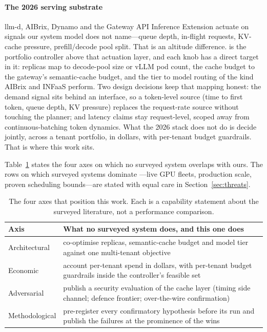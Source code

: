 \paragraph{The 2026 serving substrate}
llm-d, AIBrix, Dynamo and the Gateway API Inference Extension actuate on
signals our system model does not name---queue depth, in-flight requests,
KV-cache pressure, prefill/decode pool split. That is an altitude
difference. \polyforge{} is the portfolio controller above that actuation
layer, and each knob has a direct target in it: replicas map to decode-pool
size or vLLM pod count, the cache budget to the gateway's semantic-cache
budget, and the tier to model routing of the kind AIBrix and INFaaS
perform. Two design decisions keep that mapping honest: the demand signal
sits behind an interface, so a token-level source (time to first token,
queue depth, KV pressure) replaces the request-rate source without touching
the planner; and latency claims stay request-level, scoped away from
continuous-batching token dynamics. What the 2026 stack does not do is
decide jointly, across a tenant portfolio, in dollars, with per-tenant
budget guardrails. That is where this work sits.

Table~\ref{tab:capability} states the four axes on which no surveyed system
overlaps with ours. The rows on which surveyed systems dominate
\polyforge{}---live GPU fleets, production scale, proven scheduling
bounds---are stated with equal care in Section~\ref{sec:threats}.

\begin{table}[htbp]
\centering\tablefont
\begin{tabularx}{\textwidth}{@{}lX@{}}
\toprule
\textbf{Axis} & \textbf{What no surveyed system does, and this one does} \\
\midrule
Architectural & co-optimise replicas, semantic-cache budget and model tier
against one multi-tenant objective \\
Economic & account per-tenant spend in dollars, with per-tenant budget
guardrails inside the controller's feasible set \\
Adversarial & publish a security evaluation of the cache layer (timing side
channel; defence frontier; over-the-wire confirmation) \\
Methodological & pre-register every confirmatory hypothesis before its run
and publish the failures at the prominence of the wins \\
\bottomrule
\end{tabularx}
\caption{The four axes that position this work. Each is a capability
statement about the surveyed literature, not a performance comparison.}
\label{tab:capability}
\end{table}
